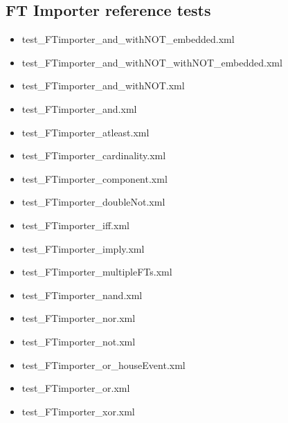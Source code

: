\subsection{FT Importer reference tests}
\begin{itemize}
	\item test\_FTimporter\_and\_withNOT\_embedded.xml
	\item test\_FTimporter\_and\_withNOT\_withNOT\_embedded.xml
	\item test\_FTimporter\_and\_withNOT.xml
	\item test\_FTimporter\_and.xml
	\item test\_FTimporter\_atleast.xml
	\item test\_FTimporter\_cardinality.xml
	\item test\_FTimporter\_component.xml
	\item test\_FTimporter\_doubleNot.xml
	\item test\_FTimporter\_iff.xml
	\item test\_FTimporter\_imply.xml
	\item test\_FTimporter\_multipleFTs.xml
	\item test\_FTimporter\_nand.xml
	\item test\_FTimporter\_nor.xml
	\item test\_FTimporter\_not.xml
	\item test\_FTimporter\_or\_houseEvent.xml
	\item test\_FTimporter\_or.xml
	\item test\_FTimporter\_xor.xml
\end{itemize}






